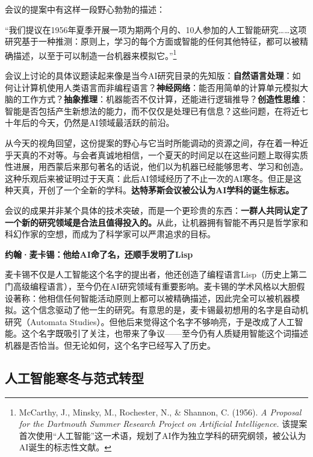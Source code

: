 会议的提案中有这样一段野心勃勃的描述：

``我们提议在1956年夏季开展一项为期两个月的、10人参加的人工智能研究……这项研究基于一种推测：原则上，学习的每个方面或智能的任何其他特征，都可以被精确描述，以至于可以制造一台机器来模拟它。''\footnote{McCarthy, J., Minsky, M., Rochester, N., \& Shannon, C. (1956). \emph{A Proposal for the Dartmouth Summer Research Project on Artificial Intelligence.} 该提案首次使用``人工智能''这一术语，规划了AI作为独立学科的研究纲领，被公认为AI诞生的标志性文献。}

会议上讨论的具体议题读起来像是当今AI研究目录的先知版：\textbf{自然语言处理}：如何让计算机使用人类语言而非编程语言？\textbf{神经网络}：能否用简单的计算单元模拟大脑的工作方式？\textbf{抽象推理}：机器能否不仅计算，还能进行逻辑推导？\textbf{创造性思维}：智能是否包括产生新想法的能力，而不仅仅是处理已有信息？这些问题，在将近七十年后的今天，仍然是AI领域最活跃的前沿。

从今天的视角回望，这份提案的野心与它当时所能调动的资源之间，存在着一种近乎天真的不对等。与会者真诚地相信，一个夏天的时间足以在这些问题上取得实质性进展，用西蒙后来那句著名的话说，他们以为机器已经能够思考、学习和创造。这种乐观后来被证明过于天真：此后AI领域经历了不止一次的AI寒冬。但正是这种天真，开创了一个全新的学科。\textbf{达特茅斯会议被公认为AI学科的诞生标志。}

会议的成果并非某个具体的技术突破，而是一个更珍贵的东西：\textbf{一群人共同认定了一个新的研究领域是合法且值得投入的。}从此，让机器拥有智能不再只是哲学家和科幻作家的空想，而成为了科学家可以严肃追求的目标。

\begin{funbox}
\small\textbf{约翰·麦卡锡：他给AI命了名，还顺手发明了Lisp}

麦卡锡不仅是人工智能这个名字的提出者，他还创造了编程语言Lisp（历史上第二门高级编程语言），至今仍在AI研究领域有重要影响。麦卡锡的学术风格以大胆假设著称：他相信任何智能活动原则上都可以被精确描述，因此完全可以被机器模拟。这个信念驱动了他一生的研究。有意思的是，麦卡锡最初想用的名字是自动机研究（Automata Studies）。但他后来觉得这个名字不够响亮，于是改成了人工智能。这个名字既吸引了关注，也带来了争议——至今仍有人质疑用智能这个词描述机器是否恰当。但无论如何，这个名字已经写入了历史。
\end{funbox}

\subsection{人工智能寒冬与范式转型}

